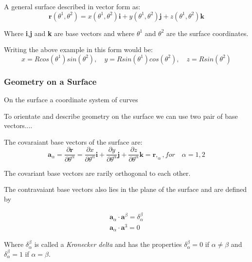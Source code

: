 A general surface described in vector form as:
\begin{equation}
\textbf{r}(\theta^1,\theta^2) = x(\theta^1,\theta^2)\textbf{i} +  y(\theta^1,\theta^2)\textbf{j}+  z(\theta^1,\theta^2)\textbf{k}
\end{equation}

Where \textbf{i},\textbf{j} and \textbf{k} are base vectors and where $\theta^1$ and $\theta^2$ are the surface coordinates.



Writing the above example in this form would be:
\begin{equation}
x = R cos(\theta^1) sin (\theta^2),\quad
y = R  sin(\theta^1) cos (\theta^2),\quad
z = R sin(\theta^2)
\end{equation}

\subsubsection{Geometry on a Surface}

On the surface a coordinate system of curves

To orientate and describe geometry on the surface we can use two pair of base vectors....

The covaraiant base vectors of the surface are:
\begin{equation} \label{convariantDiff}
 \textbf{a}_\alpha = \frac{\partial\textbf{r}}{\partial \theta^\alpha } = \frac{\partial x}{\partial \theta^\alpha }\textbf{i} + \frac{\partial y}{\partial \theta^\alpha }\textbf{j}+\frac{\partial z}{\partial \theta^\alpha }\textbf{k} = \textbf{r},_{\alpha} , for\quad \alpha = 1,2
\end{equation}


The covariant base vectors are rarily orthogonal to each other.

The contravaiant base vectors also lies in the plane of the surface and are defined by

\begin{align}
\textbf{a}_{\alpha} \cdot \textbf{a}^\beta = \delta^{\beta}_\alpha \\
\textbf{a}_{\alpha} \cdot \textbf{a}^3 = 0    
\end{align}

Where $\delta^{\beta}_\alpha$ is called a \textit{Kronecker delta} and has the properties $\delta^{\beta}_\alpha = 0$ if $\alpha \neq  \beta$ and $\delta^{\beta}_\alpha = 1$ if $\alpha =  \beta$. 
 
